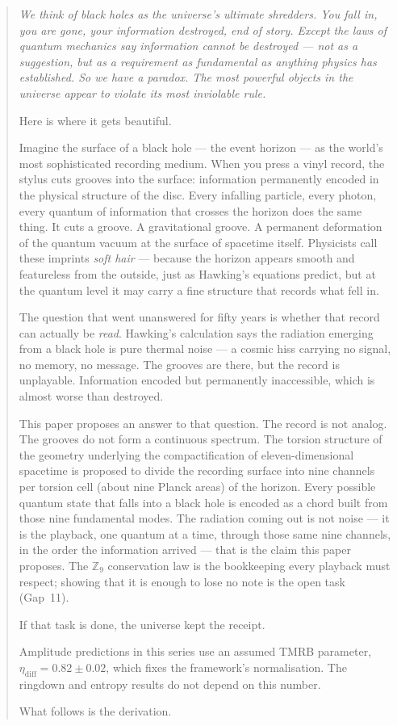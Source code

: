 \documentclass[11pt,a4paper]{article}
\begin{document}
\begin{quote}
\itshape
We think of black holes as the universe's ultimate shredders. You fall in,
you are gone, your information destroyed, end of story. Except the laws of
quantum mechanics say information cannot be destroyed --- not as a suggestion,
but as a requirement as fundamental as anything physics has established. So
we have a paradox. The most powerful objects in the universe appear to
violate its most inviolable rule.

Here is where it gets beautiful.

Imagine the surface of a black hole --- the event horizon --- as the world's
most sophisticated recording medium. When you press a vinyl record, the stylus
cuts grooves into the surface: information permanently encoded in the physical
structure of the disc. Every infalling particle, every photon, every quantum of
information that crosses the horizon does the same thing. It cuts a groove. A
gravitational groove. A permanent deformation of the quantum vacuum at the
surface of spacetime itself. Physicists call these imprints \emph{soft hair} ---
because the horizon appears smooth and featureless from the outside, just as
Hawking's equations predict, but at the quantum level it may carry a
fine structure that records what fell in.

The question that went unanswered for fifty years is whether that record can
actually be \emph{read}. Hawking's calculation says the radiation emerging from
a black hole is pure thermal noise --- a cosmic hiss carrying no signal, no
memory, no message. The grooves are there, but the record is unplayable.
Information encoded but permanently inaccessible, which is almost worse than
destroyed.

This paper proposes an answer to that question. The record is not analog. The grooves do not
form a continuous spectrum. The torsion structure of the geometry underlying
the compactification of eleven-dimensional spacetime is proposed to divide the
recording surface into nine channels per torsion cell
(about nine Planck areas) of the horizon. Every possible quantum state that falls into a black hole is
encoded as a chord built from those nine fundamental modes. The radiation coming
out is not noise --- it is the playback, one quantum at a time, through those
same nine channels, in the order the information arrived --- that is the
claim this paper proposes. The
$\mathbb{Z}_9$ conservation law is the bookkeeping every playback must respect;
showing that it is enough to lose no note is the open task (Gap~11).

If that task is done, the universe kept the receipt.

Amplitude predictions in this series use an assumed TMRB parameter,
$\eta_{\mathrm{diff}} = 0.82 \pm 0.02$, which fixes the framework's
normalisation. The ringdown and entropy results do not depend on this
number.

What follows is the derivation.
\end{quote}
\end{document}
